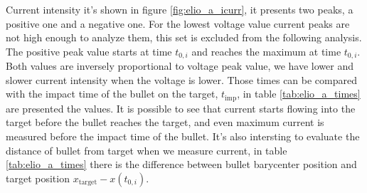 Current intensity it's shown in figure \ref{fig:elio_a_icurr}, it presents two peaks, a positive one and a negative one. For the lowest voltage value current peaks are not high enough to analyze them, this set is excluded from the following analysis.
The positive peak value starts at time $t_{0,i}$ and reaches the maximum at time $t_{0,i}$. Both values are inversely proportional to voltage peak value, we have lower and slower current intensity when the voltage is lower. Those times can be compared with the impact time of the bullet on the target, $t_{\text{imp}}$, in table \ref{tab:elio_a_times} are presented the values. 
It is possible to see that current starts flowing into the target before the bullet reaches the target, and even maximum current is measured before the impact time of the bullet.
It's also intersting to evaluate the distance of bullet from target when we measure current, in table \ref{tab:elio_a_times} there is the difference between bullet barycenter position and target position $x_{\text{target}} - x(t_{0,i})$.


